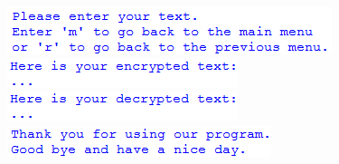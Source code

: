 \documentclass[a4paper,12pt,abstracton,titlepage]{scrartcl}
\begin{document}
{
\vspace{1cm}
\includegraphics{./Pictures/interface/english/05_english_insertText.png}		%
\vspace{1cm}
\includegraphics{./Pictures/interface/english/06_english_cryptage_showText.png}		%
\vspace{1cm}
\includegraphics{./Pictures/interface/english/06_english_decryptage_showText.png}		%
\vspace{1cm}
\includegraphics{./Pictures/interface/english/07_english_quitMessage.png}		%
\vspace{1cm}
}
\newpage
\end{document}
